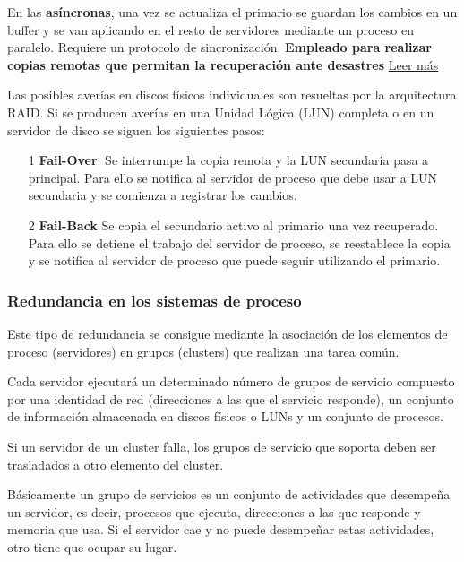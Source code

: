 En las \textbf{asíncronas}, una vez se actualiza el primario se guardan los cambios en un buffer y se van aplicando en el resto de servidores mediante un proceso en paralelo. Requiere un protocolo de sincronización. \textbf{Empleado para realizar copias remotas que permitan la recuperación ante desastres} \href{http://searchdatacenter.techtarget.com/es/consejo/Ventajas-e-inconvenientes-de-la-replicacion-remota-en-la-recuperacion-de-desastres}{Leer más}

Las posibles averías en discos físicos individuales son resueltas por la arquitectura RAID. Si se producen averías en una Unidad Lógica (LUN) completa o en un servidor de disco se siguen los siguientes pasos:
\begin{enumerate}
\item[1] \textbf{Fail-Over}. Se interrumpe la copia remota y la LUN secundaria pasa a principal. Para ello se notifica al servidor de proceso que debe usar a LUN secundaria y se comienza a registrar los cambios.

\item[2] \textbf{Fail-Back} Se copia el secundario activo al primario una vez recuperado. Para ello se detiene el trabajo del servidor de proceso, se reestablece la copia y se notifica al servidor de proceso que puede seguir utilizando el primario.
\end{enumerate}


\subsubsection{Redundancia en los sistemas de proceso}
Este tipo de redundancia se consigue mediante la asociación de los elementos de proceso (servidores) en grupos (clusters) que realizan una tarea común.

Cada servidor ejecutará un determinado número de grupos de servicio compuesto por una identidad de red (direcciones a las que el servicio responde), un conjunto de información almacenada en discos físicos o LUNs y un conjunto de procesos.

Si un servidor de un cluster falla, los grupos de servicio que soporta deben ser trasladados a otro elemento del cluster.

Básicamente un grupo de servicios es un conjunto de actividades que desempeña un servidor, es decir, procesos que ejecuta, direcciones a las que responde y memoria que usa. Si el servidor cae y no puede desempeñar estas actividades, otro tiene que ocupar su lugar.


